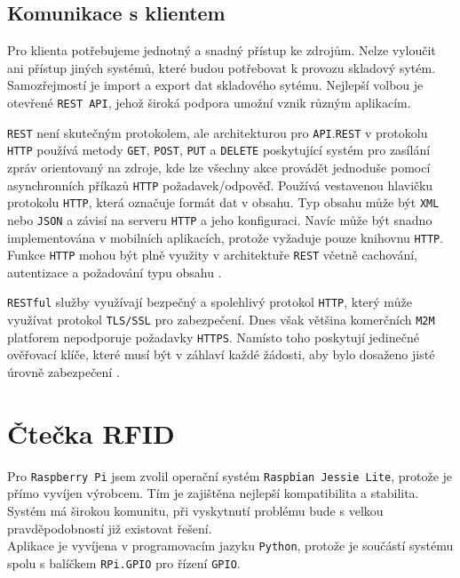 \documentclass[czech,BP]{thesiskiv}
\begin{document}
\newpage
		\subsection{Komunikace s klientem}
			Pro klienta potřebujeme jednotný a snadný přístup ke zdrojům. Nelze vyloučit ani přístup jiných systémů, které budou potřebovat k provozu skladový sytém. Samozřejmostí je import a export dat skladového sytému. Nejlepší volbou je otevřené \texttt{REST API}, jehož široká podpora umožní vznik různým aplikacím.


		
		\texttt{REST} není skutečným protokolem, ale architekturou pro \texttt{API}.\texttt{REST} v protokolu \texttt{HTTP} používá metody \texttt{GET}, \texttt{POST}, \texttt{PUT} a \texttt{DELETE} poskytující systém pro zasílání zpráv orientovaný na zdroje, kde lze všechny akce provádět jednoduše pomocí asynchronních příkazů \texttt{HTTP} požadavek/odpověď. Používá vestavenou hlavičku protokolu \texttt{HTTP}, která označuje formát dat v obsahu. Typ obsahu může být \texttt{XML} nebo \texttt{JSON} a závisí na serveru \texttt{HTTP} a jeho konfiguraci. Navíc může být snadno implementována v mobilních aplikacích, protože vyžaduje pouze knihovnu \texttt{HTTP}. Funkce \texttt{HTTP} mohou být plně využity v architektuře \texttt{REST} včetně cachování, autentizace a požadování typu obsahu \cite{karagiannis2015survey}.
		 
		 \texttt{RESTful} služby využívají bezpečný a spolehlivý protokol \texttt{HTTP}, který může využívat protokol \texttt{TLS/SSL} pro zabezpečení. Dnes však většina komerčních \texttt{M2M} platforem nepodporuje požadavky \texttt{HTTPS}. Namísto toho poskytují jedinečné ověřovací klíče, které musí být v záhlaví každé žádosti, aby bylo dosaženo jisté úrovně zabezpečení \cite{karagiannis2015survey}.
		 
		 



		\section{Čtečka RFID}
			Pro \texttt{Raspberry Pi} jsem zvolil operační systém \texttt{Raspbian Jessie Lite}, protože je přímo vyvíjen výrobcem. Tím je zajištěna nejlepší kompatibilita a stabilita. 
			Systém má širokou komunitu, při vyskytnutí problému bude s velkou pravděpodobností již existovat řešení.\\
			Aplikace je vyvíjena v programovacím jazyku \texttt{Python}, protože je součástí systému spolu s balíčkem \texttt{RPi.GPIO} pro řízení \texttt{GPIO}.
\end{document}
